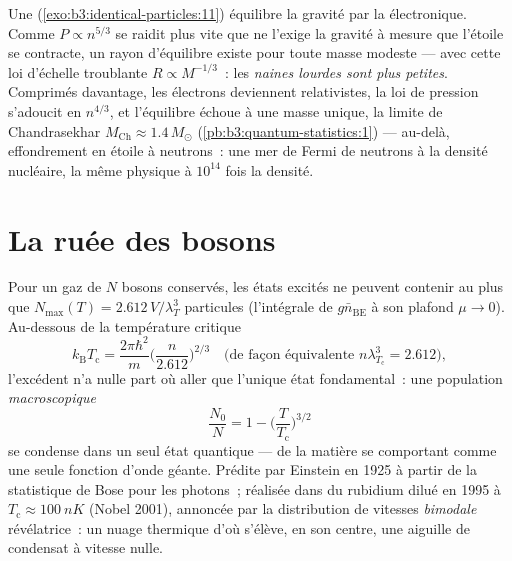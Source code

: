\begin{example}\label{ex:b3:quantum-statistics:dwarf}
Une  (\cref{exo:b3:identical-particles:11}) équilibre la
gravité par la  électronique. Comme $P \propto
n^{5/3}$ se raidit plus vite que ne l'exige la gravité à mesure que
l'étoile se contracte, un rayon d'équilibre existe pour toute masse
modeste --- avec cette loi d'échelle troublante $R \propto M^{-1/3}$~:
les \emph{naines lourdes sont plus petites}. Comprimés davantage, les
électrons deviennent relativistes, la loi de pression s'adoucit en
$n^{4/3}$, et l'équilibre échoue à une masse unique, la limite de
Chandrasekhar $M_{\text{Ch}} \approx
1.4\,M_\odot$ (\cref{pb:b3:quantum-statistics:1}) --- au-delà,
effondrement en étoile à neutrons~: une mer de Fermi de neutrons à la
densité nucléaire, la même physique à $10^{14}$ fois la densité.
\end{example}

\section{La ruée des bosons}

\begin{theorem}\label{thm:b3:quantum-statistics:bec}
Pour un gaz de $N$ bosons conservés, les états excités ne peuvent
contenir au plus que $N_{\max}(T) = 2.612\,V/\lambda_T^3$ particules
(l'intégrale de $g\bar n_{\text{BE}}$ à son plafond $\mu \to 0$).
Au-dessous de la température critique
\[
k_{\text{B}}T_{\text{c}} = \frac{2\pi\hbar^2}{m}
\Big(\frac{n}{2.612}\Big)^{2/3}
\quad\text{(de façon équivalente } n\lambda_{T_{\text{c}}}^3 = 2.612
\text{)} ,
\]
l'excédent n'a nulle part où aller que l'unique état fondamental~:
une population \emph{macroscopique}
\[
\frac{N_0}{N} = 1 - \Big(\frac{T}{T_{\text{c}}}\Big)^{3/2}
\]
se condense dans un seul état quantique --- de la matière se
comportant comme une seule fonction d'onde géante. Prédite par
Einstein en 1925 à partir de la statistique de Bose pour les
photons~; réalisée dans du rubidium dilué en 1995 à
$T_{\text{c}} \approx \qty{100}{nK}$ (Nobel 2001), annoncée par la
distribution de vitesses \emph{bimodale} révélatrice~: un nuage
thermique d'où s'élève, en son centre, une aiguille de condensat à
vitesse nulle.
\end{theorem}
\admitted

